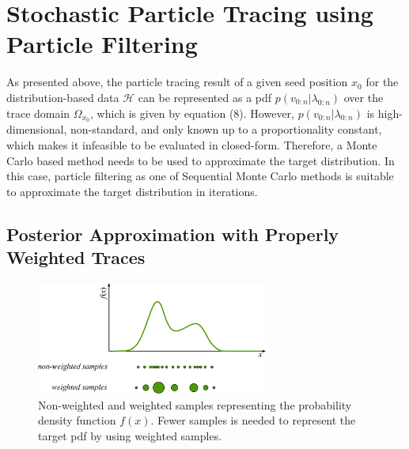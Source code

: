 \section{Stochastic Particle Tracing using Particle Filtering}

As presented above, the particle tracing result of a given seed position $x_0$ for the distribution-based data $\mathcal{H}$ can be represented as a pdf $p({v_{0:n}}|{\lambda_{0:n}})$ over the trace domain $\Omega_{x_0}$, which is given by equation (8). However, $p({v_{0:n}}|{\lambda_{0:n}})$ is high-dimensional, non-standard, and only known up to a proportionality constant, which makes it infeasible to be evaluated in closed-form. Therefore, a Monte Carlo based method needs to be used to approximate the target distribution. In this case, particle filtering as one of Sequential Monte Carlo methods is suitable to approximate the target distribution in iterations.

\subsection{Posterior Approximation with Properly Weighted Traces}

\begin{figure}[htb]
  \centering
  \includegraphics[width=3in]{../figures/importance_sampling.eps}
  \caption{Non-weighted and weighted samples representing the probability density function $f(x)$. Fewer samples is needed to represent the target pdf by using weighted samples.}
  \label{importance_sampling}
\end{figure}

